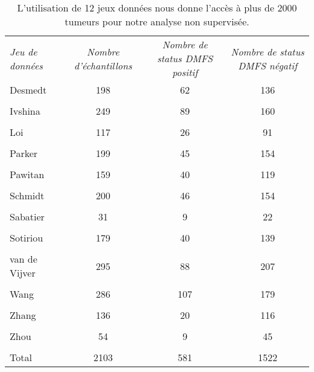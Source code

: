 			\begin{table}
				\begin{center}
					\caption{Liste des jeux de données inclus pour notre analyse non supervisée \citep{Garcia2011} (\emph{cf} ~\ref{chap:results1}).}
					\begin{tabular}{lccc}
						\toprule
						\multirow{2}{3cm}{\emph{Jeu de données}}	& \multirow{2}{3cm}{\centering\emph{Nombre d'échantillons}}	& \multirow{2}{3cm}{\centering\emph{Nombre de status \acs{DMFS} positif}} & \multirow{2}{3cm}{\centering\emph{Nombre de status \acs{DMFS} négatif}} \\
									&									&		&		\\
						\midrule
						Desmedt						& 198	& 62	&	136		\\
						\citep{Desmedt2008}			&		&		&			\\
						Ivshina						& 249	& 89	&	160		\\
						\citep{Ivshina2006}			&		&		&			\\
						Loi							& 117	& 26	&	91		\\
						\citep{Loi2008}				&		&		&			\\
						Parker						& 199	& 45	&	154		\\
						\citep{Parker2009}			&		&		&			\\
						Pawitan						& 159	& 40	&	119		\\
						\citep{Pawitan2005}			&		&		&			\\
						Schmidt						& 200	& 46	&	154		\\
						\citep{Schmidt2008}			&		&		&			\\
						Sabatier					& 31	& 9		&	22		\\
						\citep{Sabatier2011}		&		&		&			\\
						Sotiriou					& 179	& 40	&	139		\\
						\citep{Sotiriou2009}		&		&		&			\\
						van de Vijver				& 295	& 88	&	207		\\
						\citep{vandevijver2002}		&		&		&			\\
						Wang						& 286	& 107	&	179		\\
						\citep{Wang2005}			&		&		&			\\
						Zhang						& 136	& 20	&	116		\\
						\citep{Zhang2009a}			&		&		&			\\
						Zhou						& 54	& 9		&	45		\\
						\citep{Zhou2007}			&		&		&			\\
						\midrule
						Total						& 2103	& 581	&	1522	\\
						\bottomrule
					\end{tabular}
					\label{tab:Met:DSNS}
					\vspace{5ex}
					\caption*{L'utilisation de 12 jeux données nous donne l'accès à plus de 2000 tumeurs pour notre analyse non supervisée.}
				\end{center}
			\end{table}

